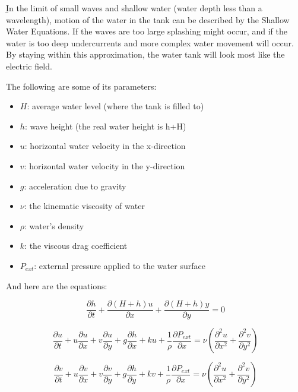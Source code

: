 \documentclass[12pt]{article}
\begin{document}
\b{In the limit of small waves and shallow water} (water depth less than a wavelength), motion of the water in the tank can be described by the Shallow Water Equations. If the waves are too large splashing might occur, and if the water is too deep undercurrents and more complex water movement will occur. By staying within this approximation, the water tank will look most like the electric field.

The following are some of its parameters:

\begin{itemize}[itemsep=0em]
    \item $H$: average water level (where the tank is filled to)
    \item $h$: wave height (the real water height is h+H)
    \item $u$: horizontal water velocity in the x-direction
    \item $v$: horizontal water velocity in the y-direction
    \item $g$: acceleration due to gravity
    \item $\nu$: the kinematic viscosity of water
    \item $\rho$: water's density
    \item $k$: the viscous drag coefficient
    \item $P_{ext}$: external pressure applied to the water surface
\end{itemize}

And here are the equations:

\begin{equation}\label{eqn:swe_h}
    \frac{\partial h}{\partial t} + \frac{\partial (H + h) u}{\partial x} + \frac{\partial (H + h) y}{\partial y} = 0
\end{equation}

\begin{equation}\label{eqn:swe_u}
    \frac{\partial u}{\partial t} + u \frac{\partial u}{\partial x} + v \frac{\partial u}{\partial y} + g \frac{\partial h}{\partial x} + ku + \frac{1}{\rho} \frac{\partial P_{ext}}{\partial x} = \nu \left( \frac{\partial^2 u}{\partial x^2} + \frac{\partial^2 v}{\partial y^2} \right)
\end{equation}

\begin{equation}\label{eqn:swe_v}
    \frac{\partial v}{\partial t} + u \frac{\partial v}{\partial x} + v \frac{\partial v}{\partial y} + g \frac{\partial h}{\partial y} + kv + \frac{1}{\rho} \frac{\partial P_{ext}}{\partial x} = \nu \left( \frac{\partial^2 u}{\partial x^2} + \frac{\partial^2 v}{\partial y^2} \right)
\end{equation}
\end{document}

